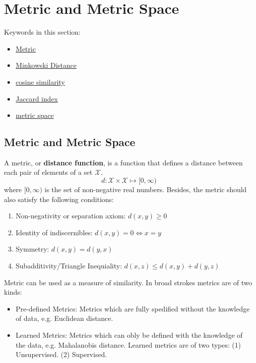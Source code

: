 \section{Metric and Metric Space}

Keywords in this section:
\begin{itemize}
	\item \href{https://en.wikipedia.org/wiki/Metric_(mathematics)}{Metric}
	\item \href{https://en.wikipedia.org/wiki/Minkowski_distance}{Minkowski Distance}
	\item \href{https://en.wikipedia.org/wiki/Cosine_similarity}{cosine similarity}
	\item \href{https://en.wikipedia.org/wiki/Jaccard_index}{Jaccard index}
	\item \href{https://en.wikipedia.org/wiki/Metric_space}{metric space}
\end{itemize}

\subsection{Metric and Metric Space}

A metric, or {\bf distance function}, is a function that defines a distance
between each pair of elements of a set $\mathcal{X}$.  $$d: \mathcal{X} \times
\mathcal{X} \mapsto [0, \infty)$$ where $[0,\infty)$ is the set of non-negative
real numbers. Besides, the metric should also satisfy the following conditions:
\begin{enumerate}
	\item Non-negativity or separation axiom: $d(x,y) \geqslant 0$
	\item Identity of indiscernibles: $d(x,y) = 0 \Leftrightarrow x=y$
	\item Symmetry: $d(x,y) = d(y,x)$
	\item Subadditivity/Triangle Inequiality: $d(x,z) \leqslant d(x,y) + d(y,z)$
\end{enumerate}

Metric can be used as a measure of similarity. In broad strokes metrics are of
two kinds:
\begin{itemize}
	\item{Pre-defined Metrics:} Metrics which are fully spedified without the
		knowledge of data, e.g. Euclidean distance.
	\item{Learned Metrics:} Metrics which can obly be defined with the
		knowledge of the data, e.g. Mahalanobis distance. Learned metrics are
		of two types: (1) Unsupervised. (2) Supervised.
\end{itemize}

